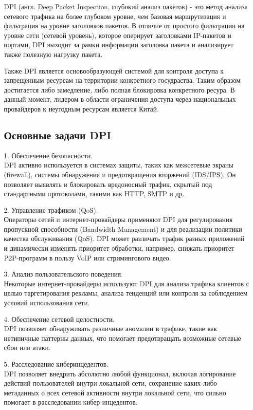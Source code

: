 \documentclass[utf8,14pt,a4paper,oneside,russian]{book}
\begin{document}
DPI (англ. Deep Packet Inspection, глубокий анализ пакетов) - это метод анализа сетевого трафика на более глубоком уровне, чем базовая
маршрутизация и фильтрация на уровне заголовков пакетов. В отличие от простого фильтрации на уровне сети (сетевой уровень), которое оперирует
заголовками IP-пакетов и портами, DPI выходит за рамки информации заголовка пакета и анализирует также полезную нагрузку пакета.

Также DPI является основообразующей системой для контроля доступа к запрещённым ресурсам на территории конкретного госудраства.
Таким образом достигается либо замедление, либо полная блокировка конкретного ресура. В данный момент, лидером в области ограничения доступа
через национальных провайдеров к неугодным ресурсам является Китай.

\subsection{Основные задачи DPI}

1. Обеспечение безопасности.\\
DPI активно используется в системах защиты, таких как межсетевые экраны (firewall), системы обнаружения и предотвращения вторжений (IDS/IPS).
Он позволяет выявлять и блокировать вредоносный трафик, скрытый под стандартными протоколами, такими как HTTP, SMTP и др.

2. Управление трафиком (QoS).\\
Операторы сетей и интернет-провайдеры применяют DPI для регулирования пропускной способности (Bandwidth Management) и для реализации политики
качества обслуживания (QoS). DPI может различать трафик разных приложений и динамически изменять приоритет обработки, например, снижать приоритет
P2P-программ в пользу VoIP или стримингового видео.

3. Анализ пользовательского поведения.\\
Некоторые интернет-провайдеры используют DPI для анализа трафика клиентов с целью таргетирования рекламы, анализа тенденций или контроля за
соблюдением условий использования сети.

4. Обеспечение сетевой целостности.\\
DPI позволяет обнаруживать различные аномалии в трафике, такие как нетипичные паттерны данных, что помогает предотвращать возможные сетевые
сбои или атаки.

5. Расследование киберинцедентов.\\
DPI позволяет внедрить абсолютно любой функционал, включая логирование действий пользователей внутри локальной сети, сохранение каких-либо
метаданных о всех сетевой активности внутри локальной сети, что сильно помогает в расследовании кибер-инцедентов.
\end{document}
